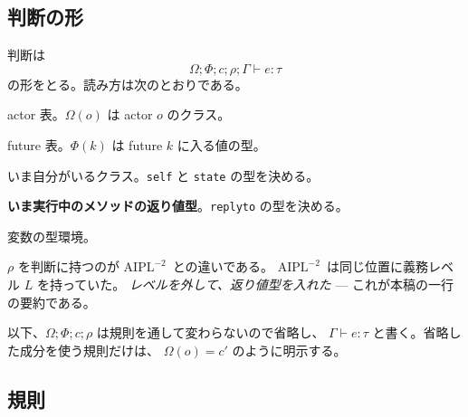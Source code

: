 \documentclass[11pt,a4paper]{ltjsarticle}
\theoremstyle{definition}
\theoremstyle{remark}
\newcommand{\tint}{\ensuremath{\mathtt{int}}}
\newcommand{\tbool}{\ensuremath{\mathtt{bool}}}
\newcommand{\tunit}{\ensuremath{\mathtt{unit}}}
\newcommand{\tstr}{\ensuremath{\mathtt{str}}}
\newcommand{\tact}[1]{\ensuremath{\mathtt{actor}[#1]}}
\newcommand{\tfut}[1]{\ensuremath{\mathtt{future}\langle #1 \rangle}}
\newcommand{\trep}[1]{\ensuremath{\mathtt{reply}\langle #1 \rangle}}
\newcommand{\Om}{\Omega}
\newcommand{\Ph}{\Phi}
\newcommand{\Atwo}{\ensuremath{\mathrm{AIPL}^{-2}}}
\begin{document}
\subsection{判断の形}

判断は
\[
\Om;\Ph;c;\rho;\Gamma \vdash e : \tau
\]
の形をとる。読み方は次のとおりである。
\begin{description}\itemsep1pt
\item[$\Om$] actor 表。$\Om(o)$ は actor $o$ のクラス。
\item[$\Ph$] future 表。$\Ph(k)$ は future $k$ に入る値の型。
\item[$c$] いま自分がいるクラス。\texttt{self} と \texttt{state} の型を決める。
\item[$\rho$] \textbf{いま実行中のメソッドの返り値型}。\texttt{replyto} の型を決める。
\item[$\Gamma$] 変数の型環境。
\end{description}
$\rho$ を判断に持つのが \Atwo\ との違いである。
\Atwo\ は同じ位置に義務レベル $L$ を持っていた。
\emph{レベルを外して、返り値型を入れた} --- これが本稿の一行の要約である。

以下、$\Om;\Ph;c;\rho$ は規則を通して変わらないので省略し、
$\Gamma \vdash e : \tau$ と書く。省略した成分を使う規則だけは、
$\Om(o)=c'$ のように明示する。

\subsection{規則}

\end{document}
